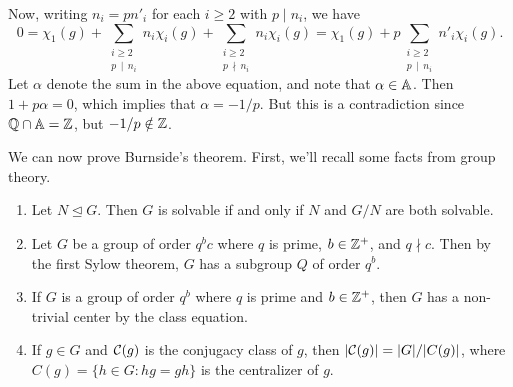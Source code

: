\begin{pf}
    Now, writing $n_i = pn'_i$ for each $i \geq 2$ with $p \mid n_i$, we have 
    \[ 0 = \chi_1(g) + \sum_{\substack{i\geq 2 \\ p\,\mid\,n_i}} n_i \chi_i(g) 
    + \sum_{\substack{i\geq 2 \\ p\,\nmid\,n_i}} n_i \chi_i(g) 
    = \chi_1(g) + p \sum_{\substack{i\geq 2 \\ p\,\mid\,n_i}} n'_i \chi_i(g). \] 
    Let $\alpha$ denote the sum in the above equation, and note that $\alpha \in \mathbb{A}$. 
    Then $1 + p\alpha = 0$, which implies that $\alpha = -1/p$. But this is a 
    contradiction since $\mathbb{Q} \cap \mathbb{A} = \mathbb{Z}$, but $-1/p \notin \mathbb{Z}$. 
\end{pf}

We can now prove Burnside's theorem. First, we'll recall some facts from group theory. 
\begin{enumerate}[(1)]
    \item Let $N \trianglelefteq G$. Then $G$ is solvable if and only if 
          $N$ and $G/N$ are both solvable. 
    \item Let $G$ be a group of order $q^b c$ where $q$ is prime, $b \in \mathbb{Z}^+$, 
          and $q \nmid c$. Then by the first Sylow theorem, $G$ has a subgroup 
          $Q$ of order $q^b$. 
    \item If $G$ is a group of order $q^b$ where $q$ is prime and $b \in \mathbb{Z}^+$, 
          then $G$ has a non-trivial center by the class equation. 
    \item If $g \in G$ and ${\cal C}(g)$ is the conjugacy class of $g$, then 
          $|{\cal C}(g)| = |G|/|C(g)|$, where $C(g) = \{h \in G : hg = gh\}$ 
          is the centralizer of $g$. 
\end{enumerate}

